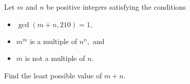 Let $m$ and $n$ be positive integers satisfying the conditions

\begin{itemize}
	\item $\gcd(m+n,210) = 1,$
	\item $m^m$ is a multiple of $n^n,$ and
	\item $m$ is not a multiple of $n$.
\end{itemize}

Find the least possible value of $m+n$.

